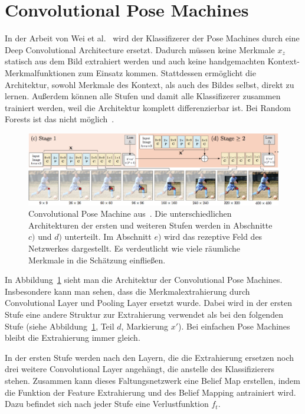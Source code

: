 \documentclass[journal, a4paper]{IEEEtran}
\begin{document}
\section{Convolutional Pose Machines}\label{subsec:Intro}
	In der Arbeit von Wei et al.~\cite{conv_pose} wird der Klassifizerer der Pose Machines durch eine Deep Convolutional Architecture ersetzt. Dadurch müssen keine Merkmale $x_z$ statisch aus dem Bild extrahiert werden und auch keine handgemachten Kontext-Merkmalfunktionen zum Einsatz kommen. Stattdessen ermöglicht die Architektur, sowohl Merkmale des Kontext, als auch des Bildes selbst, direkt zu lernen. Außerdem können alle Stufen und damit alle Klassifizerer zusammen trainiert werden, weil die Architektur komplett differenzierbar ist. Bei Random Forests ist das nicht möglich~\cite{ramakrishna2014pose}.

        \begin{figure}[!bth]
                \begin{center}
                \includegraphics[width=1\columnwidth]{convolutional_pose_machine.png}
                \caption{Convolutional Pose Machine aus~\cite{conv_pose}. Die unterschiedlichen Architekturen der ersten und weiteren Stufen werden in Abschnitte $c)$ und $d)$ unterteilt. Im Abschnitt $e)$ wird das rezeptive Feld des Netzwerkes dargestellt. Es verdeutlicht wie viele räumliche Merkmale in die Schätzung einfließen.}
                \label{fig:conv_pose_machine}
                \end{center}
        \end{figure}

        In Abbildung~\ref{fig:conv_pose_machine} sieht man die Architektur der Convolutional Pose Machines. Insbesondere kann man sehen, dass die Merkmalextrahierung durch Convolutional Layer und Pooling Layer ersetzt wurde. Dabei wird in der ersten Stufe eine andere Struktur zur Extrahierung verwendet als bei den folgenden Stufe (siehe Abbildung~\ref{fig:conv_pose_machine}, Teil $d$, Markierung $x'$). Bei einfachen Pose Machines bleibt die Extrahierung immer gleich. 

        In der ersten Stufe werden nach den Layern, die die Extrahierung ersetzen noch drei weitere Convolutional Layer angehängt, die anstelle des Klassifizierers stehen. Zusammen kann dieses Faltungsnetzwerk eine Belief Map erstellen, indem die Funktion der Feature Extrahierung und des Belief Mapping antrainiert wird. Dazu befindet sich nach jeder Stufe eine Verlustfunktion $f_{t}$.
\end{document}
